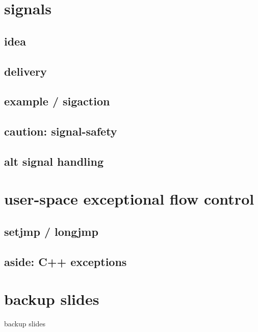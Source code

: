 \date{}
\title{}
\date{}

\begin{frame}
    \titlepage
\end{frame}



\section{signals}

\subsection{idea}



\subsection{delivery}



\subsection{example / sigaction}



\subsection{caution: signal-safety}



\subsection{alt signal handling}



\section{user-space exceptional flow control}
\subsection{setjmp / longjmp}



\subsection{aside: C++ exceptions}




\section{backup slides}
\begin{frame}{backup slides}
\end{frame}


